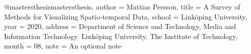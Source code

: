 @mastersthesis{mastersthesis,
  author       = {Mattias Persson}, 
  title        = {A Survey of Methods for Visualizing Spatio-temporal Data},
  school       = {Linköping University},
  year         = 2020,
  address      = {Department of Science and Technology, Media and Information Technology. Linköping University, The Institute of Technology},
  month        = 08,
  note         = {An optional note}
}